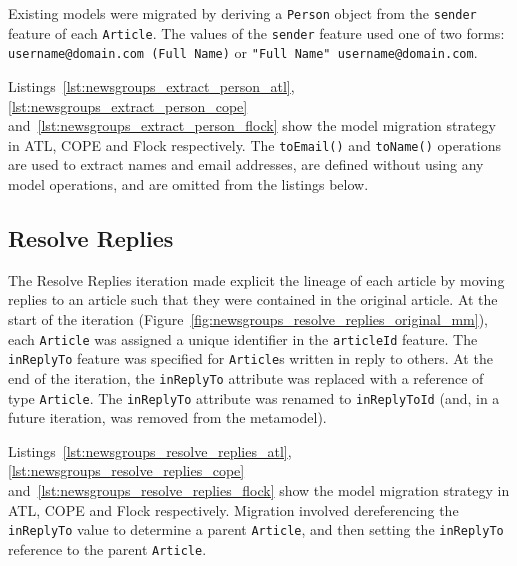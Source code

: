 
Existing models were migrated by deriving a \texttt{Pe\-rs\-on} object from the \texttt{se\-nd\-er} feature of each \texttt{Ar\-ti\-c\-le}. The values of the \texttt{se\-nd\-er} feature used one of two forms: \texttt{username@domain.com (Full Name)} or \texttt{"Full Name" username@domain.com}.

Listings~\ref{lst:newsgroups_extract_person_atl}, \ref{lst:newsgroups_extract_person_cope} and~\ref{lst:newsgroups_extract_person_flock} show the model migration strategy in ATL, COPE and Flock respectively. The \texttt{toEmail()} and \texttt{toName()} operations are used to extract names and email addresses, are defined without using any model operations, and are omitted from the listings below.


\subsection{Resolve Replies}
The Resolve Replies iteration made explicit the lineage of each article by moving replies to an article such that they were contained in the original article. At the start of the iteration (Figure~\ref{fig:newsgroups_resolve_replies_original_mm}), each \texttt{Article} was assigned a unique identifier in the \texttt{articleId} feature. The \texttt{inReplyTo} feature was specified for \texttt{Article}s written in reply to others. At the end of the iteration, the \texttt{inReplyTo} attribute was replaced with a reference of type \texttt{Article}. The \texttt{inReplyTo} attribute was renamed to \texttt{inReplyToId} (and, in a future iteration, was removed from the metamodel).


Listings~\ref{lst:newsgroups_resolve_replies_atl}, \ref{lst:newsgroups_resolve_replies_cope} and~\ref{lst:newsgroups_resolve_replies_flock} show the model migration strategy in ATL, COPE and Flock respectively. Migration involved dereferencing the \texttt{inReplyTo} value to determine a parent \texttt{Article}, and then setting the \texttt{inReplyTo} reference to the parent \texttt{Article}.



